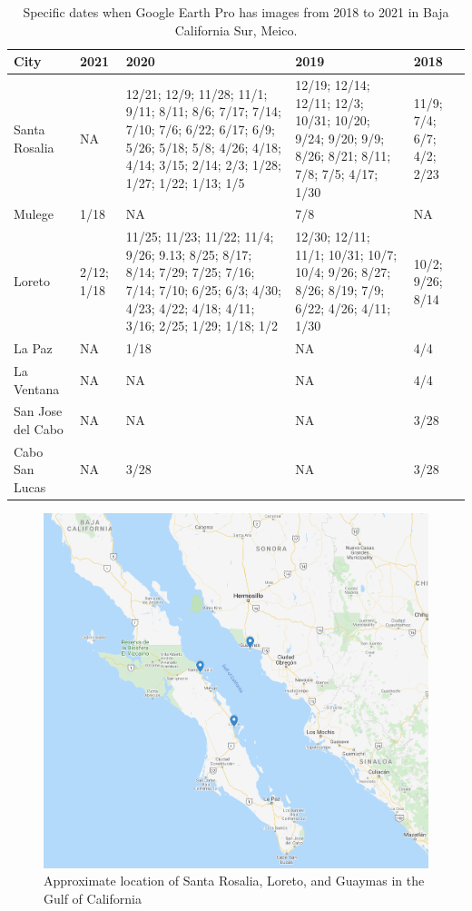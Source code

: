 \begin{table}[p]
\centering
\begin{tabular}{ l | p{2cm} | p{3cm} | p{3cm} | p{2cm} }
\toprule
City & 2021 & 2020 & 2019 & 2018 \\
\midrule
Santa Rosalia & NA & 12/21; 12/9; 11/28; 11/1; 9/11; 8/11; 8/6; 7/17; 7/14; 7/10; 7/6; 6/22; 6/17; 6/9; 5/26; 5/18; 5/8; 4/26; 4/18; 4/14; 3/15; 2/14; 2/3; 1/28; 1/27; 1/22; 1/13; 1/5 & 12/19; 12/14; 12/11; 12/3; 10/31; 10/20; 9/24; 9/20; 9/9; 8/26; 8/21; 8/11; 7/8; 7/5; 4/17; 1/30 & 11/9; 7/4; 6/7; 4/2; 2/23\\
\midrule
Mulege & 1/18 & NA & 7/8 & NA\\
\midrule
Loreto & 2/12; 1/18 & 11/25; 11/23; 11/22; 11/4; 9/26; 9.13; 8/25; 8/17; 8/14; 7/29; 7/25; 7/16; 7/14; 7/10; 6/25; 6/3; 4/30; 4/23; 4/22; 4/18; 4/11; 3/16; 2/25; 1/29; 1/18; 1/2 & 12/30; 12/11; 11/1; 10/31; 10/7; 10/4; 9/26; 8/27; 8/26; 8/19; 7/9; 6/22; 4/26; 4/11; 1/30 & 10/2; 9/26; 8/14\\
\midrule
La Paz & NA & 1/18 & NA & 4/4\\
\midrule
La Ventana & NA & NA & NA & 4/4\\
\midrule
San Jose del Cabo & NA & NA & NA & 3/28\\
\midrule
Cabo San Lucas & NA & 3/28 & NA & 3/28\\
\bottomrule
\end{tabular}
\caption{Specific dates when Google Earth Pro has images from 2018 to 2021 in Baja California Sur, Meico.}
\label{table:Baja_California_Sur_dates}
\end{table}

\begin{figure}[p]
    \centering
    \includegraphics[scale=0.4]{img/maps.png}
    \caption{Approximate location of Santa Rosalia, Loreto, and Guaymas in the Gulf of California}
    \label{fig:maps}
\end{figure}






